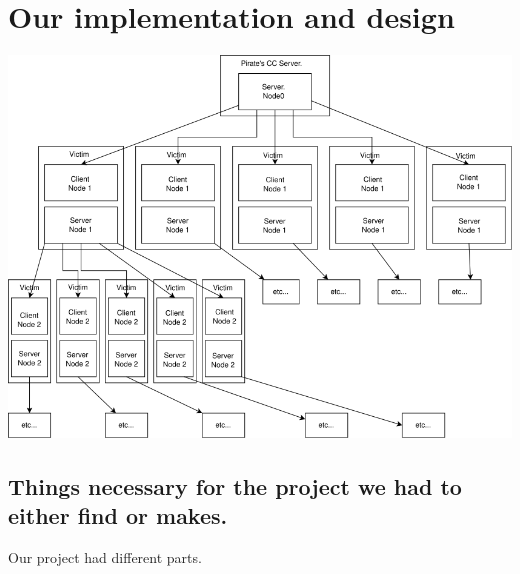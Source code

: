 \documentclass[../main.tex]{subfiles}
\begin{document}
	\chapter{Our implementation and design}

    \includegraphics[width=450pt]{botnet.png}

    \vspace{10pt}

    \section{Things necessary for the project we had to either find or makes.}

    Our project had different parts.
\end{document}
